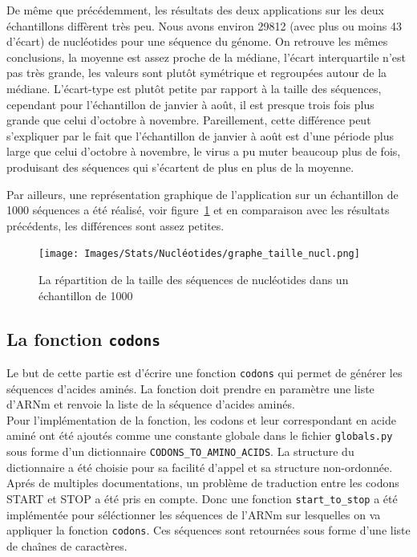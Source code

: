 \documentclass[12pt]{article}
\begin{document}
De même que précédemment, les résultats des deux applications sur les deux échantillons diffèrent très peu. Nous avons environ 29812 (avec plus ou moins 43 d'écart) de nucléotides pour une séquence du génome. On retrouve les mêmes conclusions, la moyenne est assez proche de la médiane, l'écart interquartile n'est pas très grande, les valeurs sont plutôt symétrique et regroupées autour de la médiane. L'écart-type est plutôt petite par rapport à la taille des séquences, cependant pour l'échantillon de janvier à août, il est presque trois fois plus grande que celui d'octobre à novembre. Pareillement, cette différence peut s'expliquer par le fait que l'échantillon de janvier à août est d'une période plus large que celui d'octobre à novembre, le virus a pu muter beaucoup plus de fois, produisant des séquences qui s'écartent de plus en plus de la moyenne.

Par ailleurs, une représentation graphique de l'application sur un échantillon de 1000 séquences a été réalisé, voir figure~\ref{graph:taillenucl} et en comparaison avec les résultats précédents, les différences sont assez petites.
    \begin{figure}[!h]
        \centering
        \texttt{[image: Images/Stats/Nucléotides/graphe\_taille\_nucl.png]}
        \caption{La répartition de la taille des séquences de nucléotides dans un échantillon de 1000}      \label{graph:taillenucl}
    \end{figure}



\subsection{La fonction \texttt{codons}}

Le but de cette partie est d'écrire une fonction \texttt{codons} qui permet de générer les séquences d'acides aminés. La fonction doit prendre en paramètre une liste d'ARNm et renvoie la liste de la séquence d'acides aminés. \\

Pour l'implémentation de la fonction, les codons et leur correspondant en acide aminé ont été ajoutés comme une constante globale dans le fichier \texttt{globals.py} sous forme d'un dictionnaire  \texttt{CODONS\_TO\_AMINO\_ACIDS}. La structure du dictionnaire a été choisie pour sa facilité d'appel et sa structure non-ordonnée. \\

\label{subsec:imp_codons}
Aprés de multiples documentations, un problème de traduction entre les codons START et STOP a été pris en compte. Donc une fonction \texttt{start\_to\_stop} a été implémentée pour séléctionner les séquences de l'ARNm sur lesquelles on va appliquer la fonction \texttt{codons}. Ces séquences sont retournées sous forme d'une liste de chaînes de caractères. \
\end{document}
